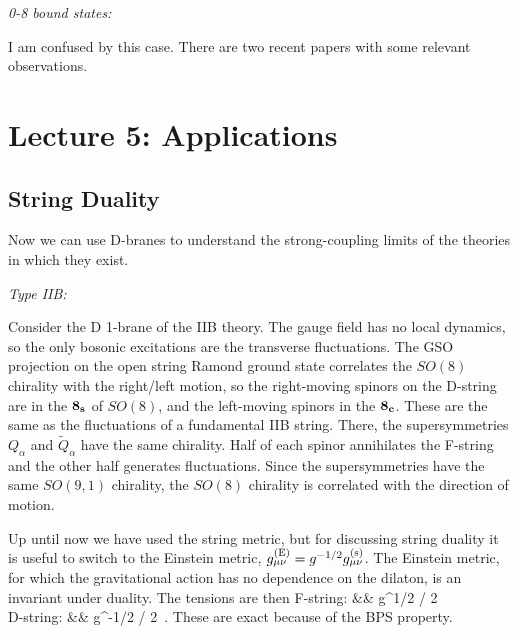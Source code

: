 {\it 0-8 bound states:} 

I am confused by this case.  There are two recent
papers with some relevant observations.\cite{08}

\section{Lecture 5: Applications}

\subsection{String Duality}

Now we can use D-branes to understand the strong-coupling limits of the
theories in which they exist.  

{\it Type IIB:}

Consider the D 1-brane of the IIB theory. The gauge field has no local
dynamics, so the only bosonic excitations are the transverse fluctuations.
The GSO projection on the open string Ramond ground state correlates the
$SO(8)$ chirality with the right/left motion, so the right-moving spinors on
the D-string are in the $\bf 8_s$ of $SO(8)$, and the left-moving spinors in
the $\bf 8_c$.
These are the same as the fluctuations of a
fundamental IIB string.\cite{witbound}  There, the supersymmetries
$Q_\alpha$ and $\tilde Q_\alpha$ have the same chirality.  Half of each
spinor annihilates the F-string and the other half generates fluctuations.
Since the supersymmetries have the same $SO(9,1)$ chirality, the $SO(8)$
chirality is correlated with the direction of motion.

Up until now we have used the string metric, but for discussing string
duality it is useful to switch to the Einstein metric, $g_{\mu\nu}^{\rm (E)}
= g^{-1/2} g_{\mu\nu}^{\rm (s)}$.   The Einstein metric, for which the
gravitational action has no dependence on the dilaton, is an invariant under
duality.
The tensions are then
\bea
\mbox{F-string:} && g^{1/2} / 2\pi\apm \nonumber\\
\mbox{D-string:} && g^{-1/2} / 2\pi\apm\ .
\eea
These are exact because of the
BPS property.  

